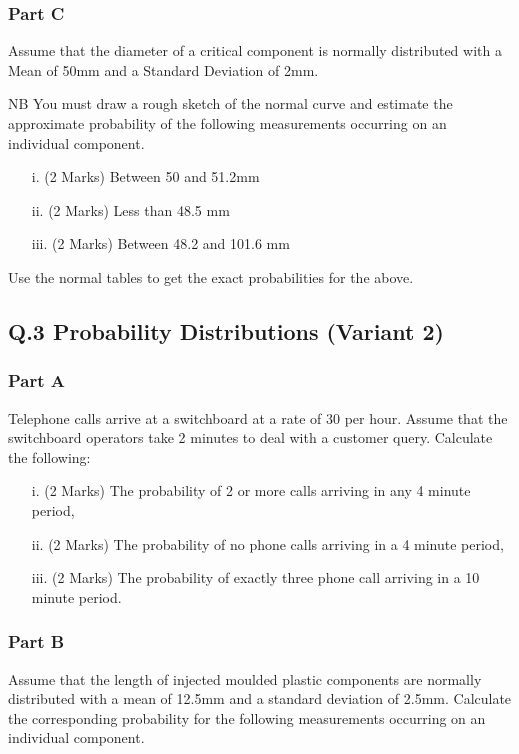 \documentclass[a4paper,12pt]{article}
\begin{document}
\subsubsection*{Part C} %
Assume that the diameter of a critical component is normally distributed with a Mean of 50mm and a Standard Deviation of 2mm.

NB 	You must draw a rough sketch of the normal curve and estimate the approximate probability of the following measurements occurring on an individual component.
\begin{itemize}
\item [i.](2 Marks)	Between 50 and 51.2mm
\item [ii.](2 Marks) Less than 48.5 mm
\item [iii.](2 Marks) Between 48.2 and 101.6 mm
\end{itemize}

Use the normal tables to get the exact probabilities for the above.
						

\newpage
\subsection*{Q.3 Probability Distributions (Variant 2)}



\subsubsection*{Part A}%
Telephone calls arrive at a switchboard at a rate of 30 per hour.  Assume that the switchboard operators take 2 minutes to deal with a customer query. Calculate the following:

\begin{itemize}
\item [i.](2 Marks)	The probability of 2 or more calls arriving in any 4 minute period,
\item [ii.](2 Marks) The probability of no phone calls arriving in a 4 minute period,
\item [iii.](2 Marks) The probability of exactly three phone call arriving in a 10 minute period.

\end{itemize}
\subsubsection*{Part B} %
Assume that the length of injected moulded plastic components are normally distributed with a mean of 12.5mm and a standard deviation of 2.5mm.  Calculate the corresponding probability for the following measurements occurring on an individual component.
\end{document}
